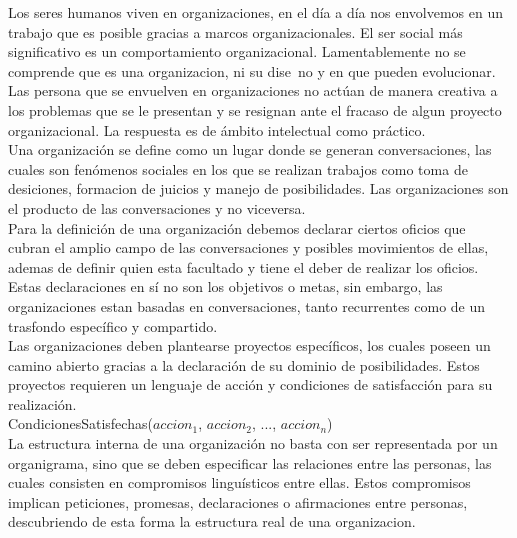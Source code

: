 Los seres humanos viven en organizaciones, en el d\'ia a d\'ia nos envolvemos en un trabajo que es posible gracias a marcos organizacionales. El ser social m\'as significativo es un comportamiento organizacional. Lamentablemente no se comprende que es una organizacion, ni su dise~no y en que pueden evolucionar. Las persona que se envuelven en organizaciones no act\'uan de manera creativa a los problemas que se le presentan y se resignan ante el fracaso de algun proyecto organizacional. La respuesta es de \'ambito intelectual como pr\'actico. \\ 

Una organizaci\'on se define como un lugar donde se generan conversaciones, las cuales son fen\'omenos sociales en los que se realizan trabajos como toma de desiciones, formacion de juicios y manejo de posibilidades. Las organizaciones son el producto de las conversaciones y no viceversa. \\ 

Para la definici\'on de una organizaci\'on debemos declarar ciertos oficios que cubran el amplio campo de las conversaciones y posibles movimientos de ellas, ademas de definir quien esta facultado y tiene el deber de realizar los oficios. \\

Estas declaraciones en s\'i no son los objetivos o metas, sin embargo, las organizaciones estan basadas en conversaciones, tanto recurrentes como de un trasfondo espec\'ifico y compartido. \\

Las organizaciones deben plantearse proyectos espec\'ificos, los cuales poseen un camino abierto gracias a la declaraci\'on de su dominio de posibilidades. Estos proyectos requieren un lenguaje de acci\'on y condiciones de satisfacci\'on para su realizaci\'on. \\

	CondicionesSatisfechas($accion_1$, $accion_2$, ..., $accion_n$)\\

La estructura interna de una organizaci\'on no basta con ser representada por un organigrama, sino que se deben especificar las relaciones entre las personas, las cuales consisten en compromisos lingu\'isticos entre ellas. Estos compromisos implican peticiones, promesas, declaraciones o afirmaciones entre personas, descubriendo de esta forma la estructura real de una organizacion. \\

